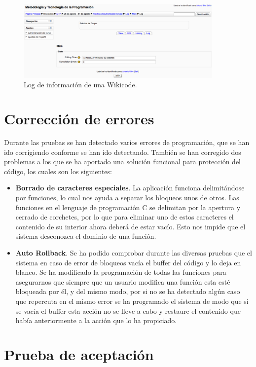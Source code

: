 \begin{figure}[h]
	\centering
	\includegraphics[width=0.9\textwidth]{./img/log.eps}
	\caption{Log de información de una Wikicode.}
\end{figure}

\section{Corrección de errores}

Durante las pruebas se han detectado varios errores de programación, que se han ido corrigiendo conforme se han ido detectando. También se han corregido dos problemas a los que se ha aportado una solución funcional para protección del código, los cuales son los siguientes:

\begin{itemize}
	\item \textbf{Borrado de caracteres especiales}. La aplicación funciona delimitándose por funciones, lo cual nos ayuda a separar los bloqueos unos de otros. Las funciones en el lenguaje de programación C se delimitan por la apertura y cerrado de corchetes, por lo que para eliminar uno de estos caracteres el contenido de su interior ahora deberá de estar vacío. Esto nos impide que el sistema desconozca el dominio de una función.
	\item \textbf{Auto Rollback}. Se ha podido comprobar durante las diversas pruebas que el sistema en caso de error de bloqueos vacía el buffer del código y lo deja en blanco. Se ha modificado la programación de todas las funciones para asegurarnos que siempre que un usuario modifica una función esta esté bloqueada por él, y del mismo modo, por si no se ha detectado algún caso que repercuta en el mismo error se ha programado el sistema de modo que si se vacía el buffer esta acción no se lleve a cabo y restaure el contenido que había anteriormente a la acción que lo ha propiciado.
\end{itemize}

\section{Prueba de aceptación}
	
